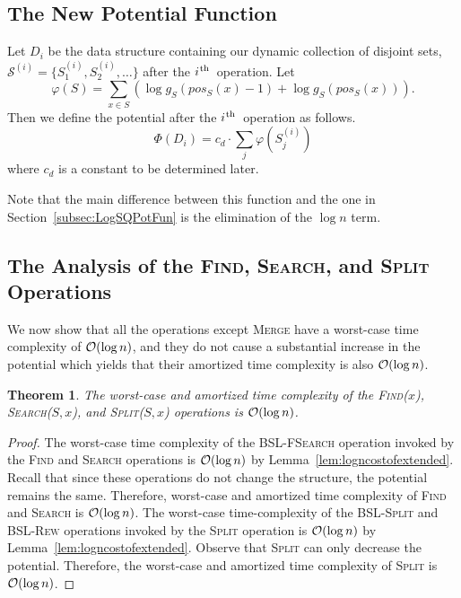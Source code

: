 \documentclass[11pt]{article}
\newcommand{\ens}[1]{\ensuremath{#1}}
\newcommand{\ith}{\ens{i^{\mbox{\hspace{.2mm}\scriptsize th}}}}
\newcommand{\kwMs}{Make-Set}
\newcommand{\kwSpl}{Split}
\newcommand{\kwUnion}{Merge}
\newcommand{\kwSrc}{Search}
\newcommand{\kwFind}{Find}
\newcommand{\Ms}{\mbox{\textsc{\kwMs}}}
\newcommand{\Spl}{\mbox{\textsc{\kwSpl}}}
\newcommand{\Splx}[2]{\mbox{\textsc{\kwSpl(\ensuremath{#1,#2})}}}
\newcommand{\Union}{\mbox{\textsc{\kwUnion{}}}}
\newcommand{\Src}{\mbox{\textsc{\kwSrc}}}
\newcommand{\Srcx}[2]{\mbox{\textsc{\kwSrc(\ensuremath{#1,#2})}}}
\newcommand{\Find}{\mbox{\textsc{\kwFind}}}
\newcommand{\Findx}[1]{\mbox{\textsc{\kwFind(\ensuremath{#1})}}}
\newcommand{\Bslfsrc}{\mbox{\textsc{BSL-FSearch}}}
\newcommand{\Bslspl}{\mbox{\textsc{BSL-Split}}}
\newcommand{\Bslrew}{\mbox{\textsc{BSL-Rew}}}
\newcommand{\cons}[1]{\ensuremath{c_{#1}}}
\newcommand{\cnsd}{\cons d}
\newcommand{\node}[1]{\ensuremath{#1}}
\newcommand{\nodeposition}[2]{pos\ensuremath{_{\set #1}(\node #2)}}
\newcommand{\set}[1]{\ensuremath{#1}}
\newcommand{\collection}[1]{\ensuremath{\mathcal #1}}
\newcommand{\numgap}[2]{\ensuremath{g_{\set #1}(#2)}}
\newcommand{\datast}[1]{\ensuremath{D_{#1}}}
\newcommand{\hide}[1]{}
\newcounter{count}
\newtheorem{thm}[count]{Theorem}
\begin{document}
\subsection{The New Potential Function} 
\label{subsec:AnalysisPotential} 


Let \datast i be the data structure containing our dynamic collection of disjoint sets, $\collection S^{(i)} = \{\set S_1^{(i)}, \set S_2^{(i)},\ldots\}$ after the \ith\ operation. Let 
\[\varphi(\set S) = \sum_{\node x\in \set S} (\log \numgap{S}{\nodeposition{S}{x}-1} + \log \numgap{S}{\nodeposition{S}{x}}).\] 
 Then we define the potential after the \ith\ operation as follows. 
\begin{equation}
\label{eq:mainpotential}
\Phi(\datast i) = \cnsd\cdot\sum_j \varphi(\set S_j^{(i)}) 
\end{equation}
where $\cnsd$ is a constant to be determined later. 

Note that the main difference between this 
function and the one in Section~\ref{subsec:LogSQPotFun} is the elimination of the $\log n$ term. 


\subsection{The Analysis of the \hide{\Ms{}, }\Find{}, \Src{}, and \Spl{} Operations} 
\label{subsec:AnalysisOthers} 
We now show that all the operations except \Union{} have a worst-case time  complexity of ${\cal O}(\log n)$, and they do not cause a substantial increase in the potential which yields that  their amortized time complexity is also ${\cal O}(\log n)$. 

\begin{thm} 
\label{thm:otheropsbound} 
The worst-case and amortized time complexity of the \Findx{x}, \Srcx{S}{x}, and \Splx{S}{x} operations is ${\cal O}(\log n)$. 
\end{thm} 

\begin{proof} 
The worst-case time complexity of the \Bslfsrc{} operation invoked by the \Find{} and \Src{} operations is ${\cal O}(\log n)$ by Lemma~\ref{lem:logncostofextended}.  Recall that since these operations do not change the structure, the potential remains the same. Therefore, worst-case and amortized time complexity of \Find{} and \Src{} is ${\cal O}(\log n)$. 
The worst-case time-complexity of the \Bslspl{} and \Bslrew{} operations invoked by the \Spl{} operation is ${\cal O}(\log n)$ by Lemma~\ref{lem:logncostofextended}. Observe that \Spl{} can only decrease the potential. Therefore, the worst-case and amortized time complexity of \Spl{} is ${\cal O}(\log n)$. 
\end{proof} 
\end{document}
